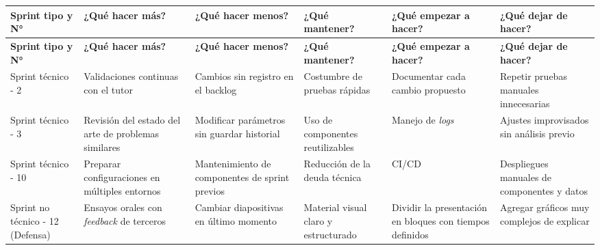 \documentclass[
11pt, %
]{charter}
\begin{document}
\begin{table}[htpb]
\renewcommand{\arraystretch}{1.4}
\begin{tabular}{|>{\raggedright\arraybackslash}p{1.8cm}|
                >{\raggedright\arraybackslash}p{2.3cm}|
                >{\raggedright\arraybackslash}p{2.3cm}|
                >{\raggedright\arraybackslash}p{2.3cm}|
                >{\raggedright\arraybackslash}p{2.3cm}|
                >{\raggedright\arraybackslash}p{2.3cm}|}
\hline
\rowcolor[HTML]{CCCCCC} 
\textbf{Sprint tipo y N°} & \textbf{¿Qué hacer más?} & \textbf{¿Qué hacer menos?} & \textbf{¿Qué mantener?} & \textbf{¿Qué empezar a hacer?} & \textbf{¿Qué dejar de hacer?} \\
\hline
\textbf{Sprint tipo y N°} & \textbf{¿Qué hacer más?} & \textbf{¿Qué hacer menos?} & \textbf{¿Qué mantener?} & \textbf{¿Qué empezar a hacer?} & \textbf{¿Qué dejar de hacer?} \\
\hline
Sprint técnico - 2 & Validaciones continuas con el tutor & Cambios sin registro en el backlog & Costumbre de pruebas rápidas & Documentar cada cambio propuesto &  Repetir pruebas manuales innecesarias\\
\hline
Sprint técnico - 3 & Revisión del estado del arte de problemas similares & Modificar parámetros sin guardar historial & Uso de componentes reutilizables & Manejo de \textit{logs}  & Ajustes improvisados sin análisis previo \\
\hline
Sprint técnico - 10 & Preparar configuraciones en múltiples entornos & Mantenimiento de componentes de sprint previos & Reducción de la deuda técnica & CI/CD & Despliegues manuales de componentes y datos\\
\hline
Sprint no técnico - 12 (Defensa) & Ensayos orales con \textit{feedback} de terceros & Cambiar diapositivas en último momento & Material visual claro y estructurado & Dividir la presentación en bloques con tiempos definidos & Agregar gráficos muy complejos de explicar \\
\hline
\end{tabular}
\end{table}
\end{document}

